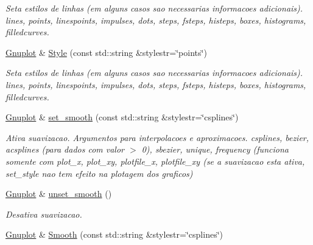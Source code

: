 \begin{DoxyCompactItemize}
\begin{DoxyCompactList}\small\item\em Seta estilos de linhas (em alguns casos sao necessarias informacoes adicionais). lines, points, linespoints, impulses, dots, steps, fsteps, histeps, boxes, histograms, filledcurves. \end{DoxyCompactList}\item 
\hypertarget{classGnuplot_ae64e911770994ba05cc2f6dcbfe31540}{\hyperlink{classGnuplot}{Gnuplot} \& \hyperlink{classGnuplot_ae64e911770994ba05cc2f6dcbfe31540}{Style} (const std\-::string \&stylestr=\char`\"{}points\char`\"{})}\label{classGnuplot_ae64e911770994ba05cc2f6dcbfe31540}

\begin{DoxyCompactList}\small\item\em Seta estilos de linhas (em alguns casos sao necessarias informacoes adicionais). lines, points, linespoints, impulses, dots, steps, fsteps, histeps, boxes, histograms, filledcurves. \end{DoxyCompactList}\item 
\hypertarget{classGnuplot_aa18386919da2ec4c994f1f9c7195d384}{\hyperlink{classGnuplot}{Gnuplot} \& \hyperlink{classGnuplot_aa18386919da2ec4c994f1f9c7195d384}{set\-\_\-smooth} (const std\-::string \&stylestr=\char`\"{}csplines\char`\"{})}\label{classGnuplot_aa18386919da2ec4c994f1f9c7195d384}

\begin{DoxyCompactList}\small\item\em Ativa suavizacao. Argumentos para interpolacoes e aproximacoes. csplines, bezier, acsplines (para dados com valor $>$ 0), sbezier, unique, frequency (funciona somente com plot\-\_\-x, plot\-\_\-xy, plotfile\-\_\-x, plotfile\-\_\-xy (se a suavizacao esta ativa, set\-\_\-style nao tem efeito na plotagem dos graficos) \end{DoxyCompactList}\item 
\hypertarget{classGnuplot_aec18795f217d6d8791275a1c866b550e}{\hyperlink{classGnuplot}{Gnuplot} \& \hyperlink{classGnuplot_aec18795f217d6d8791275a1c866b550e}{unset\-\_\-smooth} ()}\label{classGnuplot_aec18795f217d6d8791275a1c866b550e}

\begin{DoxyCompactList}\small\item\em Desativa suavizacao. \end{DoxyCompactList}\item 
\hypertarget{classGnuplot_aedd7a473c34c83b3b9ec1cea9891d0f2}{\hyperlink{classGnuplot}{Gnuplot} \& \hyperlink{classGnuplot_aedd7a473c34c83b3b9ec1cea9891d0f2}{Smooth} (const std\-::string \&stylestr=\char`\"{}csplines\char`\"{})}\label{classGnuplot_aedd7a473c34c83b3b9ec1cea9891d0f2}


\end{DoxyCompactItemize}
